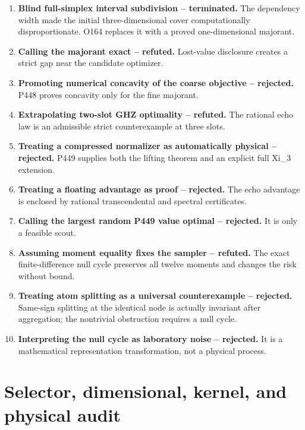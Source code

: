 \documentclass[11pt,a4paper,openany]{report}
\begin{document}
\begin{enumerate}
\item 
\textbf{Blind full-simplex interval subdivision -- terminated.} The dependency width made the initial three-dimensional cover computationally disproportionate. O164 replaces it with a proved one-dimensional majorant.

\item 
\textbf{Calling the majorant exact -- refuted.} Lost-value disclosure creates a strict gap near the candidate optimizer.

\item 
\textbf{Promoting numerical concavity of the coarse objective -- rejected.} P448 proves concavity only for the fine majorant.

\item 
\textbf{Extrapolating two-slot GHZ optimality -- refuted.} The rational echo law is an admissible strict counterexample at three slots.

\item 
\textbf{Treating a compressed normalizer as automatically physical -- rejected.} P449 supplies both the lifting theorem and an explicit full Xi\_3 extension.

\item 
\textbf{Treating a floating advantage as proof -- rejected.} The echo advantage is enclosed by rational transcendental and spectral certificates.

\item 
\textbf{Calling the largest random P449 value optimal -- rejected.} It is only a feasible scout.

\item 
\textbf{Assuming moment equality fixes the sampler -- refuted.} The exact finite-difference null cycle preserves all twelve moments and changes the risk without bound.

\item 
\textbf{Treating atom splitting as a universal counterexample -- rejected.} Same-sign splitting at the identical node is actually invariant after aggregation; the nontrivial obstruction requires a null cycle.

\item 
\textbf{Interpreting the null cycle as laboratory noise -- rejected.} It is a mathematical representation transformation, not a physical process.

\end{enumerate}

\chapter{Selector, dimensional, kernel, and physical audit}
\end{document}
